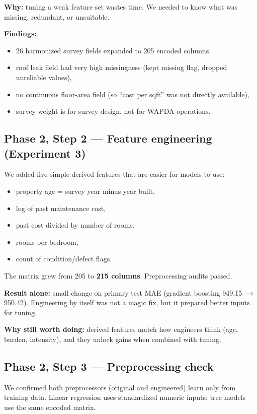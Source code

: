 \documentclass[11pt,a4paper]{article}
\begin{document}
\textbf{Why:} tuning a weak feature set wastes time. We needed to know what was missing, redundant, or unsuitable.

\textbf{Findings:}
\begin{itemize}
  \item 26 harmonized survey fields expanded to 205 encoded columns,
  \item roof leak field had very high missingness (kept missing flag, dropped unreliable values),
  \item no continuous floor-area field (so ``cost per sqft'' was not directly available),
  \item survey weight is for survey design, not for WAPDA operations.
\end{itemize}

\subsection{Phase 2, Step 2 --- Feature engineering (Experiment 3)}

We added five simple derived features that are easier for models to use:
\begin{itemize}
  \item property age = survey year minus year built,
  \item log of past maintenance cost,
  \item past cost divided by number of rooms,
  \item rooms per bedroom,
  \item count of condition/defect flags.
\end{itemize}

The matrix grew from 205 to \textbf{215 columns}. Preprocessing audits passed.

\textbf{Result alone:} small change on primary test MAE (gradient boosting 949.15 $\rightarrow$ 950.42). Engineering by itself was not a magic fix, but it prepared better inputs for tuning.

\textbf{Why still worth doing:} derived features match how engineers think (age, burden, intensity), and they unlock gains when combined with tuning.

\subsection{Phase 2, Step 3 --- Preprocessing check}

We confirmed both preprocessors (original and engineered) learn only from training data. Linear regression uses standardized numeric inputs; tree models use the same encoded matrix.
\end{document}
